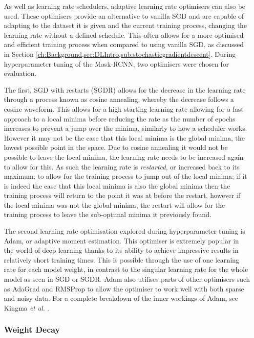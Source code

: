 As well as learning rate schedulers, adaptive learning rate optimisers can also be used. These optimisers provide an alternative to vanilla SGD and are capable of adapting to the dataset it is given and the current training process, changing the learning rate without a defined schedule. This often allows for a more optimised and efficient training process when compared to using vanilla SGD, as discussed in Section \ref{ch:Background,sec:DLIntro,sub:stochasticgradientdescent}. During hyperparameter tuning of the Mask-RCNN, two optimisers were chosen for evaluation. 

The first, SGD with restarts (SGDR) \cite{loshchilov_sgdr:_2016} allows for the decrease in the learning rate through a process known as cosine annealing, whereby the decrease follows a cosine waveform. This allows for a high starting learning rate allowing for a fast approach to a local minima before reducing the rate as the number of epochs increases to prevent a jump over the minima, similarly to how a scheduler works. However it may not be the case that this local minima is the global minima, the lowest possible point in the space. Due to cosine annealing it would not be possible to leave the local minima, the learning rate needs to be increased again to allow for this. As such the learning rate is \textit{restarted}, or increased back to its maximum, to allow for the training process to jump out of the local minima; if it is indeed the case that this local minima is also the global minima then the training process will return to the point it was at before the restart, however if the local minima was not the global minima, the restart will allow for the training process to leave the sub-optimal minima it previously found. 

The second learning rate optimisation explored during hyperparameter tuning is Adam, or adaptive moment estimation. This optimiser is extremely popular in the world of deep learning thanks to its ability to achieve impressive results in relatively short training times. This is possible through the use of one learning rate for each model weight, in contrast to the singular learning rate for the whole model as seen in SGD or SGDR. Adam also utilises parts of other optimisers such as AdaGrad \cite{duchi_adaptive_2011} and RMSProp \cite{tieleman_lecture_2012} to allow the optimiser to work well with both sparse and noisy data. For a complete breakdown of the inner workings of Adam, see Kingma \textit{et al. }\cite{kingma_adam:_2014}. 

\subsubsection{Weight Decay}\label{ch:cetDet,sec:initialTesting,sub:hyperparameters,subsub:WeightDecay}

